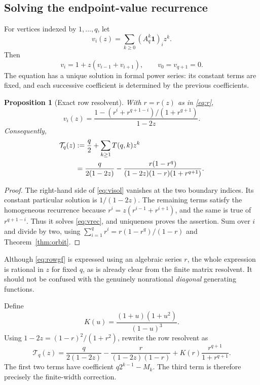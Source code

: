 \documentclass[11pt,letterpaper]{article}
\numberwithin{equation}{section}
\newtheorem{proposition}[theorem]{Proposition}
\theoremstyle{definition}
\newcommand{\one}{\mathbf 1}
\begin{document}
\subsection{Solving the endpoint-value recurrence}
For vertices indexed by $1,\ldots,q$, let
\[
v_i(z)=\sum_{k\ge0}(A_q^k\one)_iz^k.
\]
Then
\begin{equation}\label{eq:vrec}
v_i=1+z(v_{i-1}+v_{i+1}),\qquad v_0=v_{q+1}=0.
\end{equation}
The equation has a unique solution in formal power series: its constant
terms are fixed, and each successive coefficient is determined by the
previous coefficients.

\begin{proposition}[Exact row resolvent]\label{prop:resolvent}
With $r=r(z)$ as in \eqref{eq:r},
\begin{equation}\label{eq:visol}
v_i(z)=\frac{1-(r^i+r^{q+1-i})/(1+r^{q+1})}{1-2z}.
\end{equation}
Consequently,
\begin{align}
\mathcal T_q(z)
&:=\frac q2+\sum_{k\ge1}T(q,k)z^k\notag\\
&=\frac{q}{2(1-2z)}
-\frac{r(1-r^q)}{(1-2z)(1-r)(1+r^{q+1})}.
\label{eq:rowgf}
\end{align}
\end{proposition}
\begin{proof}
The right-hand side of \eqref{eq:visol} vanishes at the two boundary
indices.  Its constant particular solution is $1/(1-2z)$.
The remaining terms satisfy the homogeneous recurrence because
$r^i=z(r^{i-1}+r^{i+1})$, and the same is true of $r^{q+1-i}$.
Thus it solves \eqref{eq:vrec}, and uniqueness proves the assertion.
Sum over $i$ and divide by two, using
$\sum_{i=1}^q r^i=r(1-r^q)/(1-r)$ and
Theorem~\ref{thm:orbit}.
\end{proof}

Although \eqref{eq:rowgf} is expressed using an algebraic series $r$, the
whole expression is rational in $z$ for fixed $q$, as is already clear
from the finite matrix resolvent.  It should not be confused with the
genuinely nonrational \emph{diagonal} generating functions.

Define
\begin{equation}\label{eq:K}
K(u)=\frac{(1+u)(1+u^2)}{(1-u)^3}.
\end{equation}
Using $1-2z=(1-r)^2/(1+r^2)$, rewrite the row resolvent as
\begin{equation}\label{eq:rowsplit}
\mathcal T_q(z)
=\frac{q}{2(1-2z)}-\frac{r}{(1-2z)(1-r)}
+K(r)\frac{r^{q+1}}{1+r^{q+1}}.
\end{equation}
The first two terms have coefficient $q2^{k-1}-M_k$.  The third term is
therefore precisely the finite-width correction.
\end{document}
